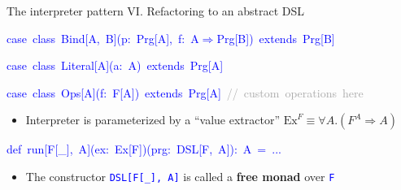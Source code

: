 \documentclass[english,,russian]{beamer}
\newenvironment{lyxcode}
  {\par\begin{list}{}{
    \setlength{\rightmargin}{\leftmargin}
    \setlength{\listparindent}{0pt}%
    \raggedright
    \setlength{\itemsep}{0pt}
    \setlength{\parsep}{0pt}
    \normalfont\ttfamily}%
   \def\{{\char`\{}
   \def\}{\char`\}}
   \def\textasciitilde{\char`\~}
   \item[]}
  {\end{list}}
\begin{document}
\begin{frame}{The interpreter pattern VI. Refactoring to an abstract DSL}
\begin{lyxcode}
\textcolor{blue}{\footnotesize{}case~class~Bind{[}A,~B{]}(p:~Prg{[}A{]},~f:~A$\Rightarrow$Prg{[}B{]})~extends~Prg{[}B{]}}{\footnotesize\par}

\textcolor{blue}{\footnotesize{}case~class~Literal{[}A{]}(a:~A)~extends~Prg{[}A{]}}{\footnotesize\par}

\textcolor{blue}{\footnotesize{}case~class~Ops{[}A{]}(f:~F{[}A{]})~extends~Prg{[}A{]}}\textcolor{darkgray}{\footnotesize{}~//~custom~operations~here}{\footnotesize\par}
\end{lyxcode}
\begin{itemize}
\item Interpreter is parameterized by a ``value extractor'' {\footnotesize{}$\text{Ex}^{F}\equiv\forall A.\left(F^{A}\Rightarrow A\right)$}{\footnotesize\par}
\end{itemize}
\begin{lyxcode}
\textcolor{blue}{\footnotesize{}def~run{[}F{[}\_{]},~A{]}(ex:~Ex{[}F{]})(prg:~DSL{[}F,~A{]}):~A~=~...}{\footnotesize\par}
\end{lyxcode}
\begin{itemize}
\item The constructor \texttt{\textcolor{blue}{\footnotesize{}DSL{[}F{[}\_{]},
A{]}}} is called a \textbf{free monad} over \texttt{\textcolor{blue}{\footnotesize{}F}} 
\end{itemize}
\end{frame}
\end{document}
